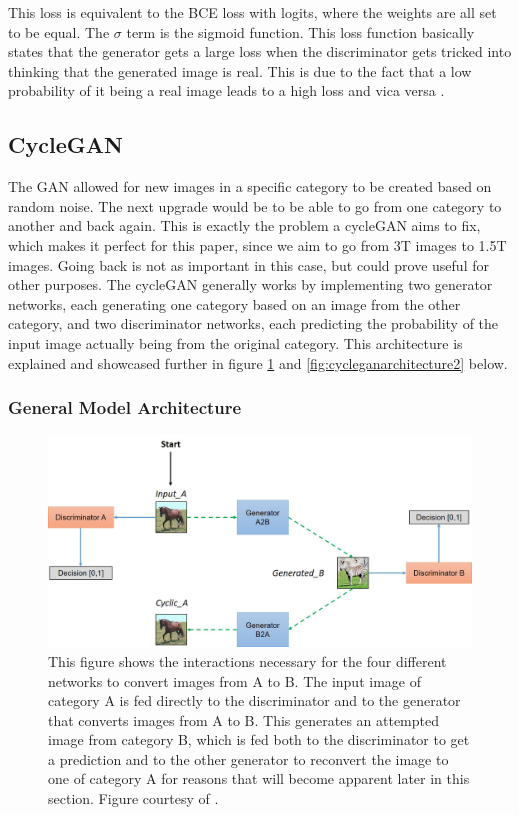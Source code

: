 \documentclass[12pt, fleqn, titlepage]{article}
\begin{document}
This loss is equivalent to the BCE loss with logits, where the weights are all set to be equal. The $\sigma$ term is the sigmoid function. This loss function basically states that the generator gets a large loss when the discriminator gets tricked into thinking that the generated image is real. This is due to the fact that a low probability of it being a real image leads to a high loss and vica versa \cite{bcewithlogits}.


\subsection{CycleGAN}\label{cyclegan}
The GAN allowed for new images in a specific category to be created based on random noise. The next upgrade would be to be able to go from one category to another and back again. This is exactly the problem a cycleGAN aims to fix, which makes it perfect for this paper, since we aim to go from 3T images to 1.5T images. Going back is not as important in this case, but could prove useful for other purposes. The cycleGAN generally works by implementing two generator networks, each generating one category based on an image from the other category, and two discriminator networks, each predicting the probability of the input image actually being from the original category. This architecture is explained and showcased further in figure \ref{fig:cycleganarchitecture} and \ref{fig:cycleganarchitecture2} below.

\subsubsection{General Model Architecture}
\begin{figure}[H]
	\centering
	\includegraphics[width=0.7\linewidth]{imgs/cyclegan_architecture}
	\caption{This figure shows the interactions necessary for the four different networks to convert images from A to B. The input image of category A is fed directly to the discriminator and to the generator that converts images from A to B. This generates an attempted image from category B, which is fed both to the discriminator to get a prediction and to the other generator to reconvert the image to one of category A for reasons that will become apparent later in this section. Figure courtesy of \cite{model_architecture}.}
	\label{fig:cycleganarchitecture}
\end{figure}
\end{document}

